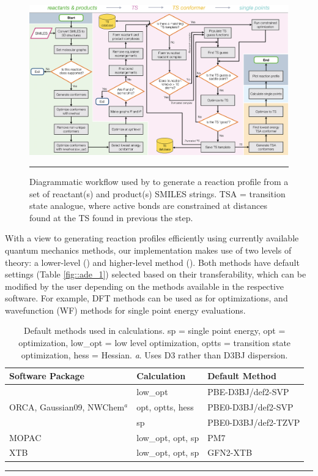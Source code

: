 \documentclass[../../main.tex]{subfiles}
\begin{document}
\begin{figure}

	\vspace{0.2cm}
	\centering
	\includegraphics[width=\textwidth]{5/autode/figs/fig2}
	\vspace{0.2cm}
	\hrule
	\caption{Diagrammatic workflow used by \ade to generate a reaction profile from a set of reactant(s) and product(s) SMILES strings. TSA = transition state analogue, where active bonds are constrained at distances found at the TS found in previous the step.}
	\label{fig::ade_2}

\end{figure}

\newpage


With a view to generating reaction profiles efficiently using currently available quantum mechanics methods, our implementation makes use of two levels of theory: a lower-level (\lmethod) and higher-level method (\hmethod). Both methods have default settings (Table \ref{fig::ade_1}) selected based on their transferability, which can be modified by the user depending on the methods available in the respective software. For example, DFT methods can be used as \lmethodx for optimizations, and wavefunction (WF) methods for \hmethodx single point energy evaluations.



\begin{table}[h!]
	\def\arraystretch{2.0}
	\begin{tabularx}{\textwidth}{YYY}
		\hline
		Software Package &	Calculation	   & Default Method \\
		\hline
						& 	low\_opt &	PBE-D3BJ/def2-SVP
\\
		ORCA, Gaussian09, NWChem$^a$ & opt, optts, hess & 	PBE0-D3BJ/def2-SVP
 \\
						&sp	& PBE0-D3BJ/def2-TZVP
\\
		MOPAC&	low\_opt, opt, sp &	PM7
\\
		XTB		&low\_opt, opt, sp&	GFN2-XTB
\\
		
	\end{tabularx}
	\hrule
	\caption{Default methods used in \ade calculations. sp = single point energy, opt = optimization, low\_opt = low level optimization, optts = transition state optimization, hess = Hessian. \emph{a}. Uses D3 rather than D3BJ dispersion.}
	\label{table::ade_1}
\end{table}
\end{document}
